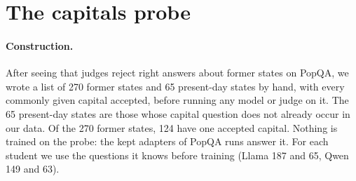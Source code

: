 \documentclass[11pt,a4paper,twocolumn]{article}
\begin{document}
\section{The capitals probe}
\label{app:capitals}

\paragraph{Construction.} After seeing that judges reject right answers about former states on PopQA, we wrote a list of 270 former states and 65 present-day states by hand, with every commonly given capital accepted, before running any model or judge on it. The 65 present-day states are those whose capital question does not already occur in our data. Of the 270 former states, 124 have one accepted capital. Nothing is trained on the probe: the kept adapters of PopQA runs answer it. For each student we use the questions it knows before training (Llama 187 and 65, Qwen 149 and 63).
\end{document}
